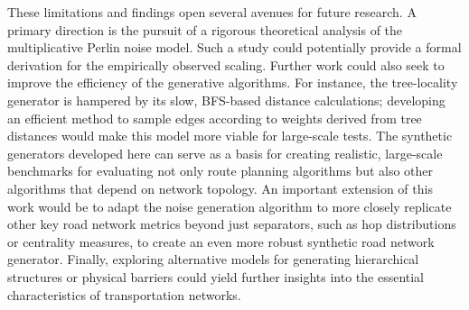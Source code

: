 These limitations and findings open several avenues for future research.
A primary direction is the pursuit of a rigorous theoretical analysis of the multiplicative Perlin noise model.
Such a study could potentially provide a formal derivation for the empirically observed  scaling.
Further work could also seek to improve the efficiency of the generative algorithms.
For instance, the tree-locality generator is hampered by its slow, BFS-based distance calculations; developing an efficient method to sample edges according to weights derived from tree distances would make this model more viable for large-scale tests.
The synthetic generators developed here can serve as a basis for creating realistic, large-scale benchmarks for evaluating not only route planning algorithms but also other algorithms that depend on network topology.
An important extension of this work would be to adapt the noise generation algorithm to more closely replicate other key road network metrics beyond just separators, such as hop distributions or centrality measures, to create an even more robust synthetic road network generator.
Finally, exploring alternative models for generating hierarchical structures or physical barriers could yield further insights into the essential characteristics of transportation networks.

